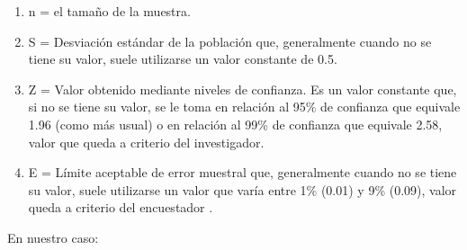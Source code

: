                 \begin{enumerate}
                    \item[]{n = el tamaño de la muestra.}
                    \item[]{S = Desviación estándar de la población que, generalmente cuando no se tiene su valor, suele utilizarse un valor constante de 0.5.}
                    \item[]{Z = Valor obtenido mediante niveles de confianza. Es un valor constante que, si no se tiene su valor, se le toma en relación al 95{\%} de confianza que equivale 1.96 (como más usual) o en relación al 99{\%} de confianza que equivale 2.58, valor que queda a criterio del investigador.}
                    \item[]{E = Límite aceptable de error muestral que, generalmente cuando no se tiene su valor, suele utilizarse un valor que varía entre 1{\%} (0.01) y 9{\%} (0.09), valor queda a criterio del encuestador  {\cite{sampieri1997}}.}
                \end{enumerate}\par
                En nuestro caso:\par
                \vskip 0.3cm  
